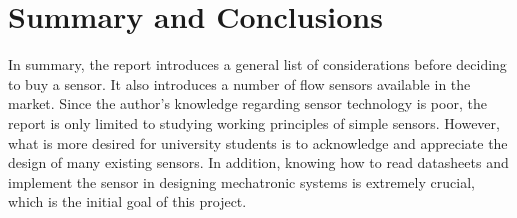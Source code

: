 \chapter{Summary and Conclusions}

In summary, the report introduces a general list of considerations before deciding to buy a sensor. It also introduces a number of flow sensors available in the market. Since the author's knowledge regarding sensor technology is poor, the report is only limited to studying working principles of simple sensors. However, what is more desired for university students is to acknowledge and appreciate the design of many existing sensors. In addition, knowing how to read datasheets and implement the sensor in designing mechatronic systems is extremely crucial, which is the initial goal of this project.